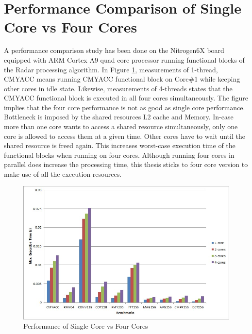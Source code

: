 \section{Performance Comparison of Single Core vs Four Cores}
\label{sec:mm:perf_comp}
A performance comparison study has been done on the Nitrogen6X board equipped with ARM Cortex A9 quad core processor running functional blocks of the Radar processing algorithm. In Figure \ref{fig:mm:1core_4core}, measurements of 1-thread, CMYACC means running CMYACC functional block on Core\#1 while keeping other cores in idle state. Likewise, measurements of 4-threads states that the CMYACC functional block is executed in all four cores simultaneously. The figure implies that the four core performance is not as good as single core performance. Bottleneck is imposed by the shared resources L2 cache and Memory. In-case more than one core wants to access a shared resource simultaneously, only one core is allowed to access them at a given time. Other cores have to wait until the shared resource is freed again. This increases worst-case execution time of the functional blocks when running on four cores. Although running four cores in parallel does increase the processing time, this thesis sticks to four core version to make use of all the execution resources.

\begin{figure}[h!]
	\centering
	\includegraphics[width=140mm]{figures/1core_4core}
	\caption{Performance of Single Core vs Four Cores}
	\label{fig:mm:1core_4core}
\end{figure}


\clearpage
